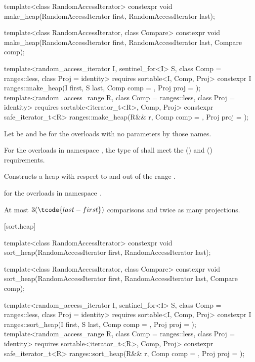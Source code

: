 %
\begin{itemdecl}
template<class RandomAccessIterator>
  constexpr void make_heap(RandomAccessIterator first, RandomAccessIterator last);

template<class RandomAccessIterator, class Compare>
  constexpr void make_heap(RandomAccessIterator first, RandomAccessIterator last,
                           Compare comp);

template<random_access_iterator I, sentinel_for<I> S, class Comp = ranges::less,
         class Proj = identity>
  requires sortable<I, Comp, Proj>
  constexpr I
    ranges::make_heap(I first, S last, Comp comp = {}, Proj proj = {});
template<random_access_range R, class Comp = ranges::less, class Proj = identity>
  requires sortable<iterator_t<R>, Comp, Proj>
  constexpr safe_iterator_t<R>
    ranges::make_heap(R&& r, Comp comp = {}, Proj proj = {});
\end{itemdecl}

\begin{itemdescr}
\pnum
Let  be 
and  be 
for the overloads with no parameters by those names.

\pnum
\requires
For the overloads in namespace ,
the type of  shall meet
the  () and
 () requirements.

\pnum
\effects
Constructs a heap with respect to  and 
out of the range .

\pnum
\returns
{} for the overloads in namespace .

\pnum
\complexity
At most $3(\tcode{last - first})$ comparisons and twice as many projections.
\end{itemdescr}

[sort.heap]{}

%
\begin{itemdecl}
template<class RandomAccessIterator>
  constexpr void sort_heap(RandomAccessIterator first, RandomAccessIterator last);

template<class RandomAccessIterator, class Compare>
  constexpr void sort_heap(RandomAccessIterator first, RandomAccessIterator last,
                           Compare comp);

template<random_access_iterator I, sentinel_for<I> S, class Comp = ranges::less,
         class Proj = identity>
  requires sortable<I, Comp, Proj>
  constexpr I
    ranges::sort_heap(I first, S last, Comp comp = {}, Proj proj = {});
template<random_access_range R, class Comp = ranges::less, class Proj = identity>
  requires sortable<iterator_t<R>, Comp, Proj>
  constexpr safe_iterator_t<R>
    ranges::sort_heap(R&& r, Comp comp = {}, Proj proj = {});
\end{itemdecl}

